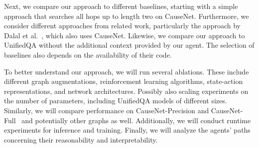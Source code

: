 
Next, we compare our approach to different baselines, starting with a simple approach that searches all hops up to length two on CauseNet. Furthermore, we consider different approaches from related work, particularly the approach by Dalal et al.~\cite{DalalCausalQAEnhancing2021, DalalCausalQAISWC2021}, which also uses CauseNet. Likewise, we compare our approach to UnifiedQA without the additional context provided by our agent. The selection of baselines also depends on the availability of their code.

To better understand our approach, we will run several ablations. These include different graph augmentations, reinforcement learning algorithms, state-action representations, and network architectures. Possibly also scaling experiments on the number of parameters, including UnifiedQA models of different sizes. Similarly, we will compare performance on CauseNet-Precision and CauseNet-Full~\cite{Heindorf2020Causenet} and potentially other graphs as well.
Additionally, we will conduct runtime experiments for inference and training. Finally, we will analyze the agents' paths concerning their reasonability and interpretability.